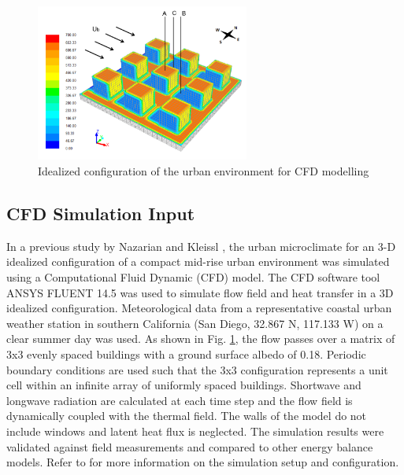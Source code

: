 \documentclass[preprint,3p,12pt,english]{elsarticle}
\begin{document}
\begin {figure}[h]
\graphicspath{ {image/} }
\includegraphics[width=7cm]{ThermalEnvironmentModel.PNG}
\centering
\caption{Idealized configuration of the urban environment for CFD modelling \cite{nazarian2014effects}}
\label{Fig.IdealUrban}
\end {figure}


\subsection{CFD Simulation Input}
In a previous study by Nazarian and Kleissl \cite{nazarian2014effects, nazarian2015cfd}, the urban microclimate for an 3-D idealized configuration of a compact mid-rise urban environment was simulated using a Computational Fluid Dynamic (CFD) model. The CFD software tool ANSYS FLUENT 14.5 was used to simulate flow field and heat transfer in a 3D idealized configuration. Meteorological data from a representative coastal urban weather station in southern California (San Diego, 32.867 N, 117.133 W) on a clear summer day was used. As shown in Fig. \ref{Fig.IdealUrban}, the flow passes over a matrix of 3x3 evenly spaced buildings with a ground surface albedo of 0.18. Periodic boundary conditions are used such that the 3x3 configuration represents a unit cell within an infinite array of uniformly spaced buildings. Shortwave and longwave radiation are calculated at each time step and the flow field is dynamically coupled with the thermal field. The walls of the model do not include windows and latent heat flux is neglected. The simulation results were validated against field measurements and compared to other energy balance models. Refer to \cite{nazarian2014effects, nazarian2015cfd} for more information on the simulation setup and configuration.
\end{document}
